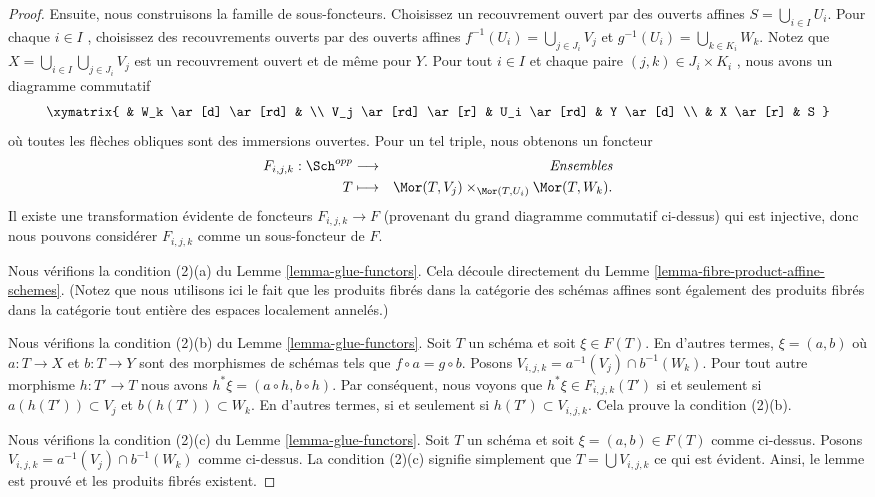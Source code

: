\begin{proof}
\medskip\noindent
Ensuite, nous construisons la famille de sous-foncteurs. Choisissez un
recouvrement ouvert par des ouverts affines  $S = \bigcup\nolimits_{i \in I} U_i$. Pour chaque
 $i \in I$ , choisissez des recouvrements ouverts par des ouverts affines
 $f^{-1}(U_i) = \bigcup\nolimits_{j \in J_i} V_j$  et  $g^{-1}(U_i) = \bigcup\nolimits_{k \in K_i} W_k$. Notez que  $X = \bigcup_{i \in I} \bigcup_{j \in J_i} V_j$  est un recouvrement ouvert et
de même pour  $Y$. Pour tout  $i \in I$  et chaque paire  $(j, k) \in J_i \times K_i$ ,
nous avons un diagramme commutatif
$$
\xymatrix{
    & W_k \ar[d] \ar[rd] &   \\
V_j \ar[rd] \ar[r] & U_i \ar[rd] & Y \ar[d] \\
    & X \ar[r]  & S
}
$$
où toutes les flèches obliques sont des immersions ouvertes. Pour un tel triple,
nous obtenons un foncteur
\begin{eqnarray*}
F_{i, j, k} : \Sch^{opp} & \longrightarrow & \textit{Ensembles} \\
T & \longmapsto &
\Mor(T, V_j) \times_{\Mor(T, U_i)} \Mor(T, W_k).
\end{eqnarray*}
Il existe une transformation évidente de foncteurs  $F_{i, j, k} \to F$  (provenant du
grand diagramme commutatif ci-dessus) qui est injective, donc nous pouvons
considérer  $F_{i, j, k}$  comme un sous-foncteur de  $F$.

\medskip\noindent
Nous vérifions la condition (2)(a) du Lemme  \ref{lemma-glue-functors}. Cela découle directement
du Lemme  \ref{lemma-fibre-product-affine-schemes}. (Notez que nous utilisons ici le fait que les produits
fibrés dans la catégorie des schémas affines sont également des produits fibrés
dans la catégorie tout entière des espaces localement annelés.)

\medskip\noindent
Nous vérifions la condition (2)(b) du Lemme  \ref{lemma-glue-functors}. Soit  $T$  un
schéma et soit  $\xi \in F(T)$. En d'autres termes,  $\xi = (a, b)$  où  $a : T \to X$  et
 $b : T \to Y$  sont des morphismes de schémas tels que  $f \circ a = g \circ b$. Posons
 $V_{i, j, k} = a^{-1}(V_j) \cap b^{-1}(W_k)$. Pour tout autre morphisme  $h : T' \to T$  nous avons  $h^*\xi = (a \circ h, b \circ h)$. Par
conséquent, nous voyons que  $h^*\xi \in F_{i, j, k}(T')$  si et seulement si  $a(h(T')) \subset V_j$  et
 $b(h(T')) \subset W_k$. En d'autres termes, si et seulement si  $h(T') \subset V_{i, j, k}$. Cela prouve la
condition (2)(b).

\medskip\noindent
Nous vérifions la condition (2)(c) du Lemme  \ref{lemma-glue-functors}. Soit  $T$  un
schéma et soit  $\xi = (a, b) \in F(T)$  comme ci-dessus. Posons  $V_{i, j, k} = a^{-1}(V_j) \cap b^{-1}(W_k)$  comme ci-dessus.
La condition (2)(c) signifie simplement que  $T = \bigcup V_{i, j, k}$  ce qui est évident.
Ainsi, le lemme est prouvé et les produits fibrés existent.
\end{proof}

